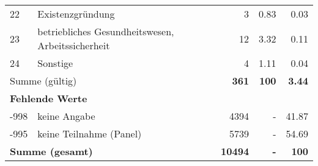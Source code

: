 \begin{longtable}{lXrrr}
        22 & \multicolumn{1}{X}{Existenzgründung} & %
          \num{3} &
          \num[round-mode=places,round-precision=2]{0.83} &
          \num[round-mode=places,round-precision=2]{0.03} \\

        23 & \multicolumn{1}{X}{betriebliches Gesundheitswesen, Arbeitssicherheit} & %
          \num{12} &
          \num[round-mode=places,round-precision=2]{3.32} &
          \num[round-mode=places,round-precision=2]{0.11} \\

        24 & \multicolumn{1}{X}{Sonstige} & %
          \num{4} &
          \num[round-mode=places,round-precision=2]{1.11} &
          \num[round-mode=places,round-precision=2]{0.04} \\

     \midrule
     \multicolumn{2}{l}{Summe (gültig)} &
       \textbf{\num{361}} &
     \textbf{\num{100}} &
       \textbf{\num[round-mode=places,round-precision=2]{3.44}} \\
     \multicolumn{5}{l}{\textbf{Fehlende Werte}}\\
       -998 &
       keine Angabe &
         \num{4394} &
        - &
         \num[round-mode=places,round-precision=2]{41.87} \\
       -995 &
       keine Teilnahme (Panel) &
         \num{5739} &
        - &
         \num[round-mode=places,round-precision=2]{54.69} \\
     \midrule
     \multicolumn{2}{l}{\textbf{Summe (gesamt)}} &
          \textbf{\num{10494}} &
        \textbf{-} &
        \textbf{\num{100}} \\
     \bottomrule
     \end{longtable}
     
